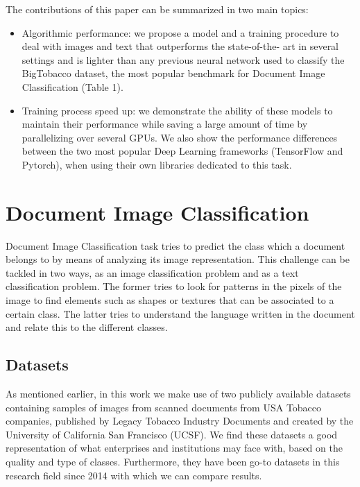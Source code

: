 \documentclass[runningheads]{llncs}
\begin{document}
The contributions of this paper can be summarized in two main topics:
\begin{itemize}
    \item Algorithmic performance: we propose a model and a training procedure to deal with images and text that outperforms the state-of-the- art in several settings and is lighter than any previous neural network used to classify the BigTobacco dataset, the most popular benchmark for Document Image Classification (Table 1).
    
    \item Training process speed up: we demonstrate the ability of these models to maintain their performance while saving a large amount of time by parallelizing over several GPUs. We also show the performance differences between the two most popular Deep Learning frameworks (TensorFlow and Pytorch), when using their own libraries dedicated to this task.
\end{itemize}









\section{Document Image Classification}

Document Image Classification task tries to predict the class which a document belongs to by means of analyzing its image representation. This challenge can be tackled in two ways, as an image classification problem and as a text classification problem. The former tries to look for patterns in the pixels of the image to find elements such as shapes or textures that can be associated to a certain class. The latter tries to understand the language written in the document and relate this to the different classes.

\subsection{Datasets}



As mentioned earlier, in this work we make use of two publicly available datasets containing samples of images from scanned documents from USA Tobacco companies, published by Legacy Tobacco Industry Documents and created by the University of California San Francisco (UCSF). We find these datasets a good representation of what enterprises and institutions may face with, based on the quality and type of classes. Furthermore, they have been go-to datasets in this research field since 2014 with which we can compare results.
\end{document}
